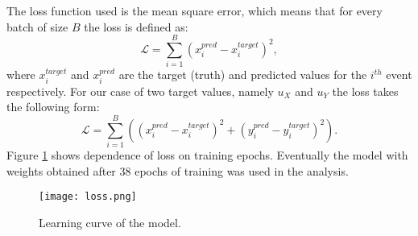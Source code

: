 The loss function used is the mean square error, which means that for every batch of size $B$ the loss is defined as:
\begin{equation}
 \mathcal{L}=\sum_{i=1}^B(x_i^{pred}-x_i^{target})^2,
\end{equation}
where $x_i^{target}$ and $x_i^{pred}$ are the target (truth) and predicted values for the $i^{th}$ event respectively. For our case of two target values, namely $u_X$ and $u_Y$ the loss takes the following form:
\begin{equation}
\mathcal{L}=\sum_{i=1}^B\left((x_i^{pred}-x_i^{target})^2+(y_i^{pred}-y_i^{target})^2\right).
\end{equation}
Figure \ref{fig::nntraining} shows dependence of loss on training epochs. Eventually the model with weights obtained after 38 epochs of training was used in the analysis. 
\begin{figure}[htpb]
	\centering
	\texttt{[image: loss.png]}
	\caption{Learning curve of the model.}
	\label{fig::nntraining}
\end{figure}

